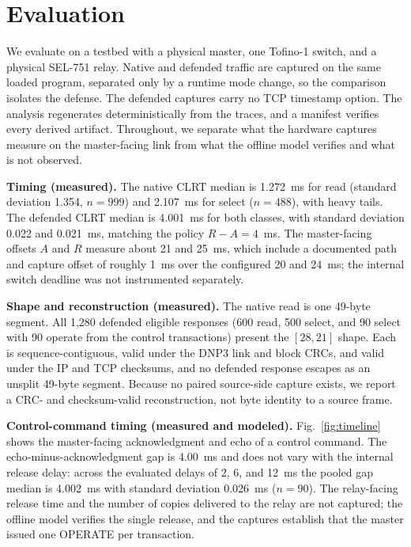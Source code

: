 \documentclass[conference]{IEEEtran}
\begin{document}
\section{Evaluation}
\label{sec:eval}

We evaluate on a testbed with a physical master, one Tofino-1 switch, and a physical SEL-751 relay.
Native and defended traffic are captured on the same loaded program, separated only by a runtime mode
change, so the comparison isolates the defense. The defended captures carry no TCP timestamp option.
The analysis regenerates deterministically from the traces, and a manifest verifies every derived
artifact. Throughout, we separate what the hardware captures measure on the master-facing link from
what the offline model verifies and what is not observed.

\noindent\textbf{Timing (measured).} The native CLRT median is 1.272~ms for read (standard deviation
1.354, $n{=}999$) and 2.107~ms for select ($n{=}488$), with heavy tails. The defended CLRT median is
4.001~ms for both classes, with standard deviation 0.022 and 0.021~ms, matching the policy $R-A=4$~ms.
The master-facing offsets $A$ and $R$ measure about 21 and 25~ms, which include a documented path and
capture offset of roughly 1~ms over the configured 20 and 24~ms; the internal switch deadline was not
instrumented separately.

\noindent\textbf{Shape and reconstruction (measured).} The native read is one 49-byte segment. All
1{,}280 defended eligible responses (600 read, 500 select, and 90 select with 90 operate from the
control transactions) present the $[28,21]$ shape. Each is sequence-contiguous, valid under the DNP3
link and block CRCs, and valid under the IP and TCP checksums, and no defended response escapes as an
unsplit 49-byte segment. Because no paired source-side capture exists, we report a CRC- and
checksum-valid reconstruction, not byte identity to a source frame.

\noindent\textbf{Control-command timing (measured and modeled).} Fig.~\ref{fig:timeline} shows the
master-facing acknowledgment and echo of a control command. The echo-minus-acknowledgment gap is
4.00~ms and does not vary with the internal release delay: across the evaluated delays of 2, 6, and
12~ms the pooled gap median is 4.002~ms with standard deviation 0.026~ms ($n{=}90$). The relay-facing
release time and the number of copies delivered to the relay are not captured; the offline model
verifies the single release, and the captures establish that the master issued one OPERATE per
transaction.
\end{document}
